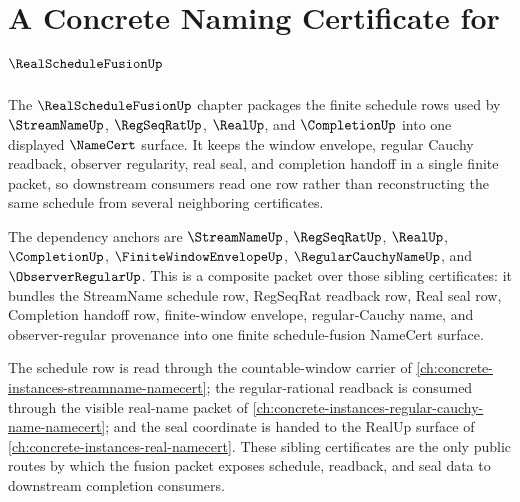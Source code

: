 \chapter{A Concrete Naming Certificate for $\RealScheduleFusionUp$}
\label{ch:concrete-instances-realschedulefusion-namecert}

The $\RealScheduleFusionUp$ chapter packages the finite schedule rows used by $\StreamNameUp$, $\RegSeqRatUp$, $\RealUp$, and $\CompletionUp$ into one displayed $\NameCert$ surface. It keeps the window envelope, regular Cauchy readback, observer regularity, real seal, and completion handoff in a single finite packet, so downstream consumers read one row rather than reconstructing the same schedule from several neighboring certificates.

The dependency anchors are $\StreamNameUp$, $\RegSeqRatUp$, $\RealUp$, $\CompletionUp$, $\FiniteWindowEnvelopeUp$, $\RegularCauchyNameUp$, and $\ObserverRegularUp$. This is a composite packet over those sibling certificates: it bundles the StreamName schedule row, RegSeqRat readback row, Real seal row, Completion handoff row, finite-window envelope, regular-Cauchy name, and observer-regular provenance into one finite schedule-fusion NameCert surface.

The schedule row is read through the countable-window carrier of \autoref{ch:concrete-instances-streamname-namecert}; the regular-rational readback is consumed through the visible real-name packet of \autoref{ch:concrete-instances-regular-cauchy-name-namecert}; and the seal coordinate is handed to the RealUp surface of \autoref{ch:concrete-instances-real-namecert}. These sibling certificates are the only public routes by which the fusion packet exposes schedule, readback, and seal data to downstream completion consumers.


